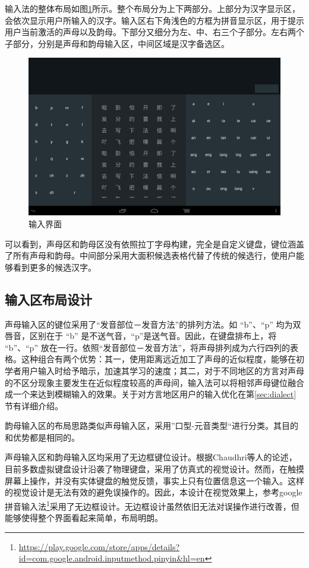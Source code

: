  输入法的整体布局如图\ref{fig:layout1_background}所示。整个布局分为上下两部分。上部分为汉字显示区，会依次显示用户所输入的汉字。输入区右下角浅色的方框为拼音显示区，用于提示用户当前激活的声母以及韵母。下部分又细分为左、中、右三个子部分。左右两个子部分，分别是声母和韵母输入区，中间区域是汉字备选区。

  \begin{figure}[h]
  \noindent\includegraphics[width=150mm]{img/layout1_background}
  \caption{输入界面}
  \label{fig:layout1_background}
  \end{figure}

  可以看到，声母区和韵母区没有依照拉丁字母构建，完全是自定义键盘，键位涵盖了所有声母和韵母。中间部分采用大面积候选表格代替了传统的候选行，使用户能够看到更多的候选汉字。

  \subsection{输入区布局设计}

  声母输入区的键位采用了“发音部位－发音方法”的排列方法。如 “b”、“p” 均为双唇音，区别在于 “b” 是不送气音，“p”是送气音。因此，在键盘排布上，将 “b”、“p” 放在一行。依照“发音部位－发音方法”，将声母排列成为六行四列的表格。这种组合有两个优势：其一，使用距离远近加工了声母的近似程度，能够在初学者用户输入时给予暗示，加速其学习的速度；其二，对于不同地区的方言对声母的不区分现象主要发生在近似程度较高的声母间，输入法可以将相邻声母键位融合成一个来达到模糊输入的效果。关于对方言地区用户的输入优化在第\ref{sec:dialect}节有详细介绍。

  韵母输入区的布局思路类似声母输入区，采用”口型-元音类型“进行分类。其目的和优势都是相同的。

  声母输入区和韵母输入区均采用了无边框键位设计。根据Chaudhri等人的论述\supercite{chaudhri}，目前多数虚拟键盘设计沿袭了物理键盘，采用了仿真式的视觉设计。然而，在触摸屏幕上操作，并没有实体键盘的触觉反馈，事实上只有位置信息这一个输入。这样的视觉设计是无法有效的避免误操作的。因此，本设计在视觉效果上，参考google拼音输入法\footnote{\url{https://play.google.com/store/apps/details?id=com.google.android.inputmethod.pinyin&hl=en}}采用了无边框设计。无边框设计虽然依旧无法对误操作进行改善，但能够使得整个界面看起来简单，布局明朗。

